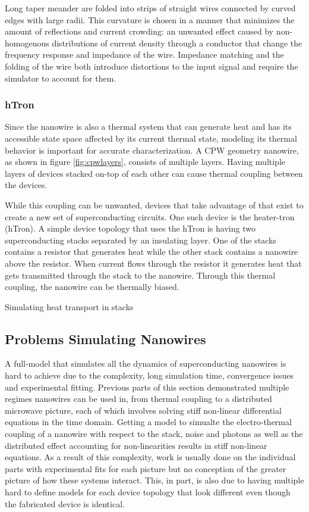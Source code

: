 \documentclass{article}
\newcommand{\todoref}[2][]{\todo[color=cyan!40, #1]{\textbf{add ref:}\\#2}}
\begin{document}
Long taper meander are folded into strips of straight wires connected by curved edges with 
large radii. This curvature is chosen in a manner that minimizes the amount of reflections
and current crowding: an unwanted effect caused by non-homogenous distributions 
of current density through a conductor that change the frequency response and impedance 
of the wire.\cite{hazra_superconducting_2016} Impedance matching and the folding of 
the wire both introduce distortions 
to the input signal and require the simulator to account for them.

\subsubsection{hTron}

Since the nanowire is also a thermal system that can generate heat and has its accessible state 
space affected by its current thermal state, modeling its thermal behavior is important for
accurate characterization. A CPW geometry nanowire, as shown in figure \ref{fig:cpwlayers}, consists 
of multiple layers. Having multiple layers of devices stacked on-top of each other can cause thermal
coupling between the devices.

While this coupling can be unwanted, devices that take advantage of that exist to create a new
set of superconducting circuits. One such device is the heater-tron (hTron)\todoref{htron!}. 
A simple device topology that uses the hTron is having two superconducting stacks separated
by an insulating layer. One of the stacks contains a resistor that generates heat while the
other stack contains a nanowire above the resistor. When current flows through the resistor
it generates heat that gets transmitted through the stack to the nanowire. Through this thermal
coupling, the nanowire can be thermally biased.

Simulating heat transport in stacks

\subsection{Problems Simulating Nanowires}

A full-model that simulates all the dynamics of superconducting nanowires is hard to achieve
due to the complexity, long simulation time, convergence issues and experimental fitting.
Previous parts of this section demonstrated multiple regimes nanowires can be used in,
from thermal coupling to a distributed microwave picture, each of which involves solving
stiff non-linear differential equations in the time domain. Getting a model to simualte
the electro-thermal coupling of a nanowire with respect to the stack, noise and photons
as well as the distributed effect accounting for non-linearities results in stiff non-linear
equations. As a result of this complexity, work is usually done on the individual parts
with experimental fits for each picture but no conception of the greater picture of how these
systems interact. This, in part, is also due to having multiple hard to define models for
each device topology that look different even though the fabricated device is identical.
\end{document}
